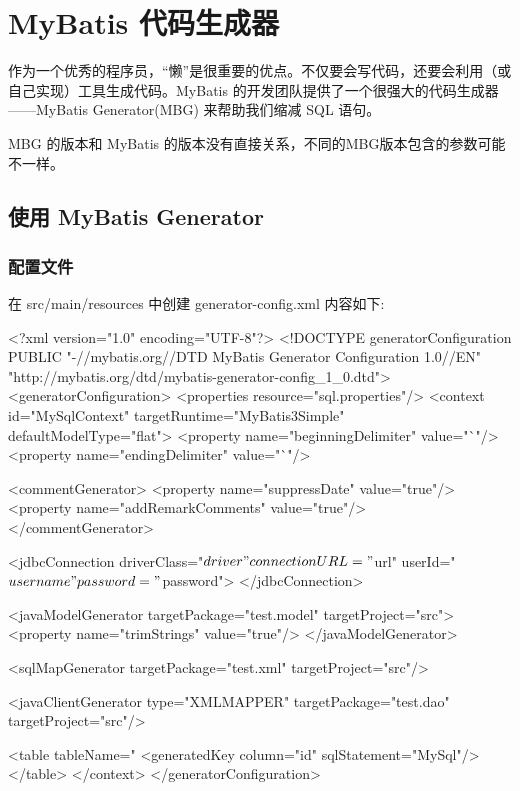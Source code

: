 \section{MyBatis 代码生成器}

作为一个优秀的程序员，“懒”是很重要的优点。不仅要会写代码，还要会利用（或自己实现）工具生成代码。MyBatis 的开发团队提供了一个很强大的代码生成器——MyBatis Generator(MBG) 来帮助我们缩减 SQL 语句。

MBG 的版本和 MyBatis 的版本没有直接关系，不同的MBG版本包含的参数可能不一样。

\subsection{使用 MyBatis Generator}

\subsubsection{配置文件}

在 src/main/resources 中创建 generator-config.xml 内容如下:

\begin{xml}
<?xml version="1.0" encoding="UTF-8"?>
<!DOCTYPE generatorConfiguration
        PUBLIC "-//mybatis.org//DTD MyBatis Generator Configuration 1.0//EN"
        "http://mybatis.org/dtd/mybatis-generator-config_1_0.dtd">
<generatorConfiguration>
    <properties resource="sql.properties"/>
    <context id="MySqlContext" targetRuntime="MyBatis3Simple" defaultModelType="flat">
        <property name="beginningDelimiter" value="`"/>
        <property name="endingDelimiter" value="`"/>

        <commentGenerator>
            <property name="suppressDate" value="true"/>
            <property name="addRemarkComments" value="true"/>
        </commentGenerator>

        <jdbcConnection driverClass="${driver}" connectionURL="${url}" userId="${username}" password="${password}">
        </jdbcConnection>

        <javaModelGenerator targetPackage="test.model" targetProject="src\main\java">
            <property name="trimStrings" value="true"/>
        </javaModelGenerator>

        <sqlMapGenerator targetPackage="test.xml" targetProject="src\main\resources"/>

        <javaClientGenerator type="XMLMAPPER" targetPackage="test.dao" targetProject="src\main\java"/>

        <table tableName="%
            <generatedKey column="id" sqlStatement="MySql"/>
        </table>
    </context>
</generatorConfiguration>
\end{xml}

